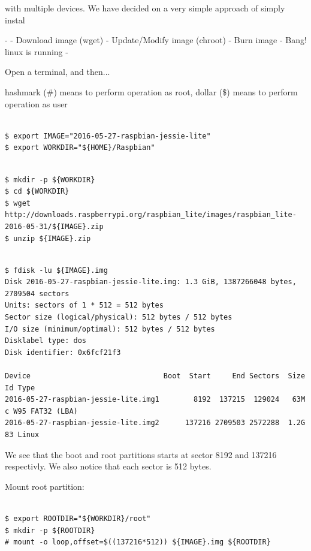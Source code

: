 with multiple devices. We
have decided on a very simple approach of simply instal


- 
- Download image (wget)
- Update/Modify image (chroot)
- Burn image
- Bang! linux is running
- 

Open a terminal, and then...

hashmark (#) means to perform operation as root, dollar (\$) means to perform operation as user

\begin{lstlisting}[]  % Start your code-block

$ export IMAGE="2016-05-27-raspbian-jessie-lite"
$ export WORKDIR="${HOME}/Raspbian"
\end{lstlisting}
\FloatBarrier



\begin{lstlisting}[]  % Start your code-block

$ mkdir -p ${WORKDIR}
$ cd ${WORKDIR}
$ wget http://downloads.raspberrypi.org/raspbian_lite/images/raspbian_lite-2016-05-31/${IMAGE}.zip
$ unzip ${IMAGE}.zip
\end{lstlisting}
\FloatBarrier


\begin{lstlisting}[]  % Start your code-block

$ fdisk -lu ${IMAGE}.img
Disk 2016-05-27-raspbian-jessie-lite.img: 1.3 GiB, 1387266048 bytes, 2709504 sectors
Units: sectors of 1 * 512 = 512 bytes
Sector size (logical/physical): 512 bytes / 512 bytes
I/O size (minimum/optimal): 512 bytes / 512 bytes
Disklabel type: dos
Disk identifier: 0x6fcf21f3

Device                               Boot  Start     End Sectors  Size Id Type
2016-05-27-raspbian-jessie-lite.img1        8192  137215  129024   63M  c W95 FAT32 (LBA)
2016-05-27-raspbian-jessie-lite.img2      137216 2709503 2572288  1.2G 83 Linux
\end{lstlisting}
\FloatBarrier

We see that the boot and root partitions starts at sector 8192 and 137216 respectivly.
We also notice that each sector is 512 bytes.


Mount root partition:
\begin{lstlisting}[]  % Start your code-block

$ export ROOTDIR="${WORKDIR}/root"
$ mkdir -p ${ROOTDIR}
# mount -o loop,offset=$((137216*512)) ${IMAGE}.img ${ROOTDIR}
\end{lstlisting}
\FloatBarrier


